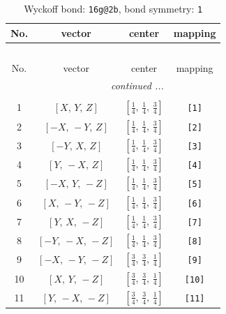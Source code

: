 \documentclass[fleqn,8pt]{jsarticle}
\begin{document}
\begin{longtable}{cccc}
\caption{Wyckoff bond: {\tt 16g@2b}, bond symmetry: {\tt 1}}
 \\
 \hline \hline
No. & vector & center & mapping \\ \hline \endfirsthead

\multicolumn{3}{l}{\tablename\ \thetable{}} \\
 \hline \hline
No. & vector & center & mapping \\ \hline \endhead

 \hline \hline
\multicolumn{3}{r}{\footnotesize\it continued ...} \\ \endfoot

 \hline \hline
\multicolumn{3}{r}{} \\ \endlastfoot

1 & $\left[ X,\, Y,\, Z \right]$ & $\left[ \frac{1}{4},\, \frac{1}{4},\, \frac{3}{4} \right]$ & {\tt [1]} \\ \hline
2 & $\left[ - X,\, - Y,\, Z \right]$ & $\left[ \frac{1}{4},\, \frac{1}{4},\, \frac{3}{4} \right]$ & {\tt [2]} \\ \hline
3 & $\left[ - Y,\, X,\, Z \right]$ & $\left[ \frac{1}{4},\, \frac{1}{4},\, \frac{3}{4} \right]$ & {\tt [3]} \\ \hline
4 & $\left[ Y,\, - X,\, Z \right]$ & $\left[ \frac{1}{4},\, \frac{1}{4},\, \frac{3}{4} \right]$ & {\tt [4]} \\ \hline
5 & $\left[ - X,\, Y,\, - Z \right]$ & $\left[ \frac{1}{4},\, \frac{1}{4},\, \frac{3}{4} \right]$ & {\tt [5]} \\ \hline
6 & $\left[ X,\, - Y,\, - Z \right]$ & $\left[ \frac{1}{4},\, \frac{1}{4},\, \frac{3}{4} \right]$ & {\tt [6]} \\ \hline
7 & $\left[ Y,\, X,\, - Z \right]$ & $\left[ \frac{1}{4},\, \frac{1}{4},\, \frac{3}{4} \right]$ & {\tt [7]} \\ \hline
8 & $\left[ - Y,\, - X,\, - Z \right]$ & $\left[ \frac{1}{4},\, \frac{1}{4},\, \frac{3}{4} \right]$ & {\tt [8]} \\ \hline
9 & $\left[ - X,\, - Y,\, - Z \right]$ & $\left[ \frac{3}{4},\, \frac{3}{4},\, \frac{1}{4} \right]$ & {\tt [9]} \\ \hline
10 & $\left[ X,\, Y,\, - Z \right]$ & $\left[ \frac{3}{4},\, \frac{3}{4},\, \frac{1}{4} \right]$ & {\tt [10]} \\ \hline
11 & $\left[ Y,\, - X,\, - Z \right]$ & $\left[ \frac{3}{4},\, \frac{3}{4},\, \frac{1}{4} \right]$ & {\tt [11]} \\ \hline

\end{longtable}
\end{document}
